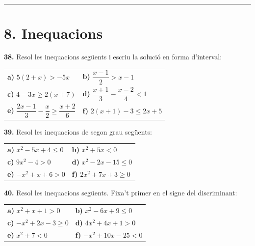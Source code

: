 \documentclass[13pt,a4paper]{extarticle}
\begin{document}
\vspace{1mm}\hrule\vspace{3mm}

\section*{8. Inequacions}

\par\noindent\begin{minipage}{\linewidth}
\textbf{38.} Resol les inequacions següents i escriu la solució en forma d'interval:\par


\begin{tabular}{@{}p{.46\linewidth}p{.46\linewidth}@{}}
\textbf{a)} $5(2+x)>-5x$ & \textbf{b)} $\dfrac{x-1}{2}>x-1$ \\[9pt]
\textbf{c)} $4-3x\geq 2(x+7)$ & \textbf{d)} $\dfrac{x+1}{3}-\dfrac{x-2}{4}<1$ \\[9pt]
\textbf{e)} $\dfrac{2x-1}{3}-\dfrac{x}{2}\geq\dfrac{x+2}{6}$ & \textbf{f)} $2(x+1)-3\leq 2x+5$ \\[9pt]
\end{tabular}\par
\end{minipage}\par\vspace{1.6mm}
\par\noindent\begin{minipage}{\linewidth}
\textbf{39.} Resol les inequacions de segon grau següents:\par


\begin{tabular}{@{}p{.46\linewidth}p{.46\linewidth}@{}}
\textbf{a)} $x^2-5x+4\leq 0$ & \textbf{b)} $x^2+5x<0$ \\[3pt]
\textbf{c)} $9x^2-4>0$ & \textbf{d)} $x^2-2x-15\leq 0$ \\[3pt]
\textbf{e)} $-x^2+x+6>0$ & \textbf{f)} $2x^2+7x+3\geq 0$ \\[3pt]
\end{tabular}\par
\end{minipage}\par\vspace{1.6mm}
\par\noindent\begin{minipage}{\linewidth}
\textbf{40.} Resol les inequacions següents. Fixa't primer en el signe del discriminant:\par


\begin{tabular}{@{}p{.46\linewidth}p{.46\linewidth}@{}}
\textbf{a)} $x^2+x+1>0$ & \textbf{b)} $x^2-6x+9\leq 0$ \\[3pt]
\textbf{c)} $-x^2+2x-3\geq 0$ & \textbf{d)} $4x^2+4x+1>0$ \\[3pt]
\textbf{e)} $x^2+7<0$ & \textbf{f)} $-x^2+10x-25<0$ \\[3pt]
\end{tabular}\par
\end{minipage}\par\vspace{1.6mm}
\end{document}
